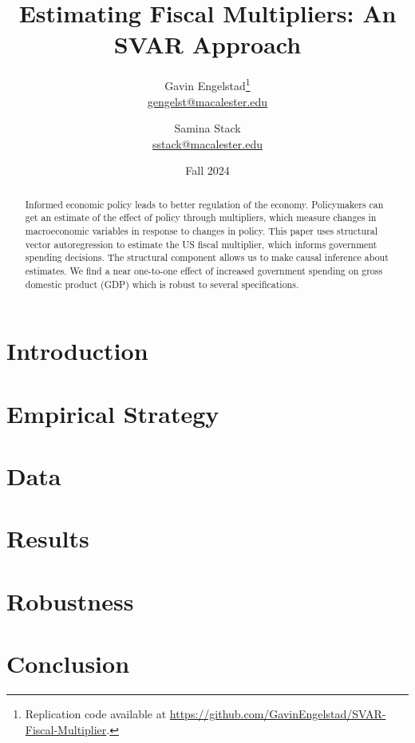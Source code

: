 \documentclass[11pt]{article}
\title{Estimating Fiscal Multipliers: An SVAR Approach}
\author{Gavin Engelstad\thanks{Replication code available at \url{https://github.com/GavinEngelstad/SVAR-Fiscal-Multiplier}.} \\ \href{mailto:gengelst@macalester.edu}{gengelst@macalester.edu} \and Samina Stack \\ \href{mailto:sstack@macalester.edu}{sstack@macalester.edu}}
\date{Fall 2024}
\numberwithin{equation}{section} %
\numberwithin{figure}{section} %
\numberwithin{table}{section} %
\begin{document}
\maketitle

\begin{abstract}
Informed economic policy leads to better regulation of the economy.  Policymakers can get an estimate of the effect of policy through multipliers, which measure changes in macroeconomic variables in response to changes in policy.  This paper uses structural vector autoregression to estimate the US fiscal multiplier, which informs government spending decisions.  The structural component allows us to make causal inference about estimates.  We find a near one-to-one effect of increased government spending on gross domestic product (GDP) which is robust to several specifications.
\end{abstract}

\section{Introduction} \label{sec:intro}


% 

\section{Empirical Strategy} \label{sec:emp}


\section{Data} \label{sec:data}


\section{Results} \label{sec:results}


\section{Robustness} \label{sec:robust}


\section{Conclusion} \label{sec:concl}



\newpage
\printbibliography
\FloatBarrier
\end{document}
